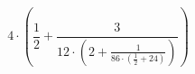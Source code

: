 \begin{equation*}
  4 \cdot \left( \frac{1}{2} + \frac{3}{12 \cdot \left(2 + \frac{1}{86 \cdot \left( \frac{1}{2} + 24 \right)}\right)} \right)
\end{equation*}

